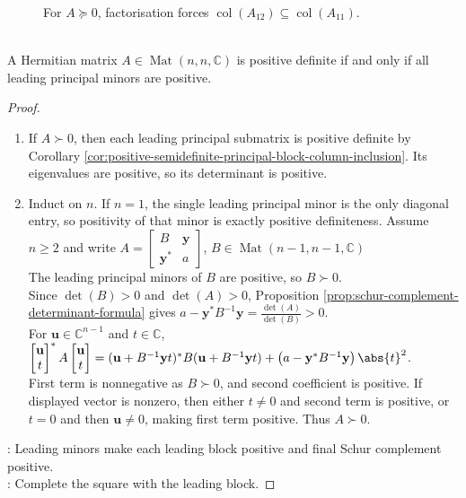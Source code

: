 \begin{figure}[H]
  \centering
  
  \caption{For $A\succeq0$, factorisation forces $\operatorname{col}(A_{12})\subseteq\operatorname{col}(A_{11})$.}
  \label{fig:principal-block-column-inclusion}
\end{figure}

\begin{theorem} \label{thm:sylvester-positive-definite-criterion-leading-minors} \\
A Hermitian matrix $A\in\operatorname{Mat}(n,n,\mathbb{C})$ is positive definite if and only if all leading principal minors are positive.
\begin{proof}
\begin{enumerate}[label=\roman*.]
\setlength{\itemsep}{0pt}
\item[$(\Rightarrow)$] If $A\succ0$, then each leading principal submatrix is positive definite by Corollary \ref{cor:positive-semidefinite-principal-block-column-inclusion}. Its eigenvalues are positive, so its determinant is positive.
\item[$(\Leftarrow)$] Induct on $n$. If $n=1$, the single leading principal minor is the only diagonal entry, so positivity of that minor is exactly positive definiteness. Assume $n\geq2$ and write $A=
\begin{bmatrix}
B & \mathbf{y}\\
\mathbf{y}^* & a
\end{bmatrix}$, $B\in\operatorname{Mat}(n-1,n-1,\mathbb{C})$\\
The leading principal minors of $B$ are positive, so $B\succ0$.\\
Since $\det(B)>0$ and $\det(A)>0$, Proposition \ref{prop:schur-complement-determinant-formula} gives $a-\mathbf{y}^*B^{-1}\mathbf{y}=\frac{\det(A)}{\det(B)}>0$.\\
For $\mathbf{u}\in\mathbb{C}^{n-1}$ and $t\in\mathbb{C}$, $\begin{bmatrix}\mathbf{u}\\ t\end{bmatrix}^*
A
\begin{bmatrix}\mathbf{u}\\ t\end{bmatrix} =(\mathbf{u}+B^{-1}\mathbf{y}t)^*B(\mathbf{u}+B^{-1}\mathbf{y}t) +\left(a-\mathbf{y}^*B^{-1}\mathbf{y}\right)\abs{t}^2$.\\
First term is nonnegative as $B\succ0$, and second coefficient is positive. If displayed vector is nonzero, then either $t\neq0$ and second term is positive, or $t=0$ and then $\mathbf{u}\neq0$, making first term positive. Thus $A\succ0$.
\end{enumerate}
: Leading minors make each leading block positive and final Schur complement positive.\\
: Complete the square with the leading block.
\end{proof}
\end{theorem}

